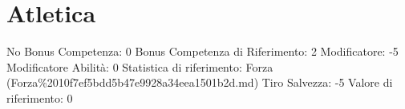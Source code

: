 \section{Atletica}\label{atletica}

\begin{description}
\tightlist
\item[Tags: ABI]
No Bonus Competenza: 0 Bonus Competenza di Riferimento: 2 Modificatore:
-5 Modificatore Abilità: 0 Statistica di riferimento: Forza
(Forza\%2010f7ef5bdd5b47e9928a34eea1501b2d.md) Tiro Salvezza: -5 Valore
di riferimento: 0
\end{description}
